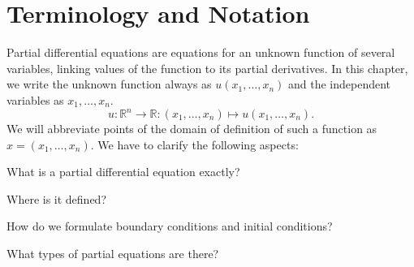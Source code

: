 %
% 
%
\chapter{Terminology and Notation
\label{chapter:terminology and notation}}
Partial differential equations are equations for an unknown function of
several variables, linking values of the function to its partial
derivatives.
In this chapter, we write the unknown function always as $u(x_1,\dots,x_n)$
and the independent variables as $x_1,\dots,x_n$.
\[
u\colon \mathbb R^n\to\mathbb R:(x_1,\dots,x_n)\mapsto u(x_1,\dots,x_n).
\]
We will abbreviate points of the domain of definition of such a function
as $x=(x_1,\dots,x_n)$.
We have to clarify the following aspects:
\begin{compactenum}
\item What is a partial differential equation exactly?
\item Where is it defined?
\item How do we formulate boundary conditions and initial conditions?
\item What types of partial equations are there?
\end{compactenum}








